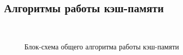 \documentclass[13pt]{article}
\begin{document}
	\subsection{Алгоритмы работы кэш-памяти}\\
	\begin{figure}[h!]
		\caption{Блок-схема общего алгоритма работы кэш-памяти}
	\end{figure}\\
\end{document}
